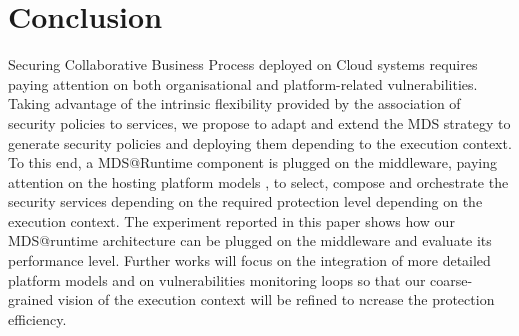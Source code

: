 \documentclass[runningheads,a4paper]{llncs}
\begin{document}
\section{Conclusion}
Securing Collaborative Business Process deployed on Cloud systems requires paying attention on both organisational and platform-related vulnerabilities. Taking advantage of the intrinsic flexibility provided by the association of security policies to services, we propose to adapt and extend the MDS strategy to generate security policies and deploying them depending to the execution context. To this end, a MDS@Runtime component is plugged on the middleware, paying attention on the hosting platform models , to select, compose and orchestrate the security services depending on the required protection level depending on the execution context.  The experiment reported in this paper shows how our MDS@runtime architecture can be plugged on the middleware and evaluate its performance level.
Further works will focus on the integration of more detailed platform models and on vulnerabilities monitoring loops so that our coarse-grained vision of the execution context will be refined to ncrease the protection efficiency.
\end{document}
